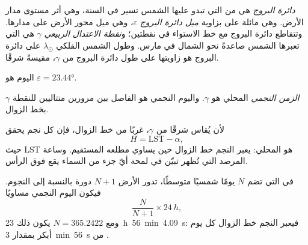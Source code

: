 \begin{definition}\label{def:b1:spherical-astronomy:ecliptic}
\emph{دائرة البروج} هي  من  التي تبدو عليها الشمس تسير في السنة، وهي أثر مستوى مدار الأرض. وهي مائلة على  بزاوية \emph{ميل دائرة البروج} $\varepsilon$، وهي ميل محور الأرض على مدارها. وتتقاطع دائرة البروج مع خط الاستواء في نقطتين؛ و\emph{نقطة الاعتدال الربيعي} $\gamma$ هي التي تعبرها الشمس صاعدةً نحو الشمال في مارس. وطول الشمس الفلكي $\lambda_\odot$ على دائرة البروج هو زاويتها على طول دائرة البروج من $\gamma$، مقيسةً شرقًا.
\end{definition}

 اليوم هو $\varepsilon = \ang{23.44}$.

\begin{definition}\label{def:b1:spherical-astronomy:sidereal-time}
\emph{الزمن النجمي} المحلي هو   $\gamma$. واليوم النجمي هو الفاصل بين مرورين متتاليين للنقطة $\gamma$ بخط الزوال.
\end{definition}

لأن  يُقاس شرقًا من $\gamma$،  غربًا من خط الزوال، فإن كل نجم يحقق
\[
  H = \mathrm{LST} - \alpha ,
\]
حيث LST هو  المحلي: يعبر النجم خط الزوال حين يساوي  مطلعه المستقيم. وساعة المرصد التي تُظهر  تبيّن في لمحة أيّ جزء من السماء يقع فوق الرأس.

\begin{proposition}\label{prop:b1:spherical-astronomy:sidereal-day}
في  التي تضم $N$ يومًا شمسيًا متوسطًا، تدور الأرض $N + 1$ دورة بالنسبة إلى النجوم. فيكون اليوم النجمي مساويًا
\[
  \frac{N}{N + 1}\times\qty{24}{h},
\]
ومع $N = 365.2422$ يكون ذلك \qty{23}{h}~\qty{56}{min}~\qty{4.09}{s}: فيعبر النجم خط الزوال كل يوم أبكر بمقدار \qty{3}{min}~\qty{56}{s} من .
\end{proposition}

